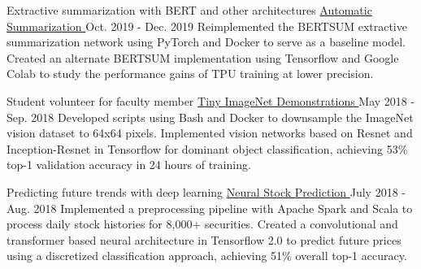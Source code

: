 

\begin{cventries}

  \cventry
  	{Extractive summarization with BERT and other architectures} %
		{
			\href{https://github.com/TidalPaladin/neural-summarizer}
			{Automatic Summarization \faGithubSquare}
		} %
  	{Oct. 2019 - Dec. 2019} %
    {} %
	{
		Reimplemented the BERTSUM extractive summarization network using
		PyTorch and Docker to serve as a baseline model. Created an
		alternate BERTSUM implementation using Tensorflow and Google Colab
		to study the performance gains of TPU training at lower precision.
	}

  \cventry
  	{Student volunteer for faculty member} %
		{
			\href{https://github.com/TidalPaladin/tiny-imagenet-demo}
			{Tiny ImageNet Demonstrations \faGithubSquare}
		} %
  	{May 2018 - Sep. 2018} %
    {} %
	{
		Developed scripts using Bash and Docker to downsample
		the ImageNet vision dataset to 64x64 pixels.
		Implemented vision networks based on Resnet and
		Inception-Resnet in Tensorflow for dominant object
		classification, achieving 53\% top-1 validation accuracy
		in 24 hours of training.
	}

  \cventry
  	{Predicting future trends with deep learning} %
		{
			\href{https://github.com/TidalPaladin/trader}
			{Neural Stock Prediction \faGithubSquare}
		} %
  	{July 2018 - Aug. 2018} %
    {} %
	{
		Implemented a preprocessing pipeline with Apache Spark and Scala
		to process daily stock histories for 8,000+ securities.
		Created a convolutional and transformer based neural architecture
		in Tensorflow 2.0 to predict future prices using a discretized
		classification approach, achieving 51\% overall top-1 accuracy.
	}

\end{cventries}
